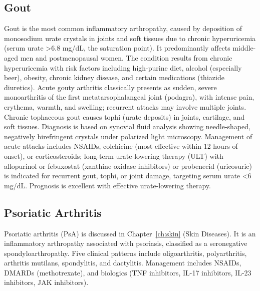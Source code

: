 \subsection{Gout}
\label{sec:Gout}
Gout is the most common inflammatory arthropathy, caused by deposition of monosodium urate crystals in joints and soft tissues due to chronic hyperuricemia (serum urate >6.8 mg/dL, the saturation point). It predominantly affects middle-aged men and postmenopausal women. The condition results from chronic hyperuricemia with risk factors including high-purine diet, alcohol (especially beer), obesity, chronic kidney disease, and certain medications (thiazide diuretics). Acute gouty arthritis classically presents as sudden, severe monoarthritis of the first metatarsophalangeal joint (podagra), with intense pain, erythema, warmth, and swelling; recurrent attacks may involve multiple joints. Chronic tophaceous gout causes tophi (urate deposits) in joints, cartilage, and soft tissues. Diagnosis is based on synovial fluid analysis showing needle-shaped, negatively birefringent crystals under polarized light microscopy. Management of acute attacks includes NSAIDs, colchicine (most effective within 12 hours of onset), or corticosteroids; long-term urate-lowering therapy (ULT) with allopurinol or febuxostat (xanthine oxidase inhibitors) or probenecid (uricosuric) is indicated for recurrent gout, tophi, or joint damage, targeting serum urate <6 mg/dL. Prognosis is excellent with effective urate-lowering therapy.

\subsection{Psoriatic Arthritis}
\label{sec:Psoriatic Arthritis}
Psoriatic arthritis (PsA) is discussed in Chapter~\ref{ch:skin} (Skin Diseases). It is an inflammatory arthropathy associated with psoriasis, classified as a seronegative spondyloarthropathy. Five clinical patterns include oligoarthritis, polyarthritis, arthritis mutilans, spondylitis, and dactylitis. Management includes NSAIDs, DMARDs (methotrexate), and biologics (TNF inhibitors, IL-17 inhibitors, IL-23 inhibitors, JAK inhibitors).

